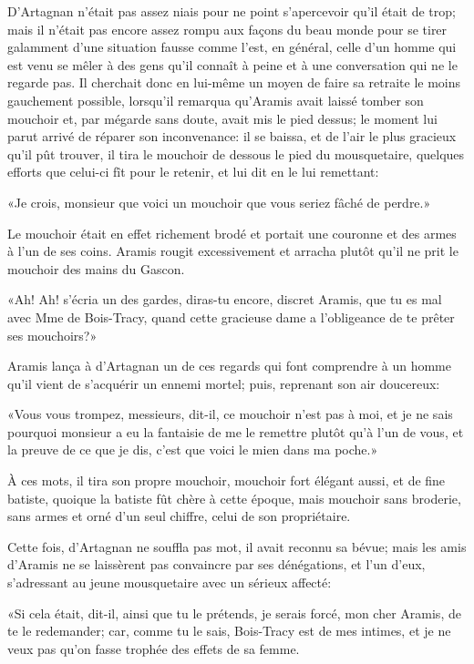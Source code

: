 D'Artagnan n'était pas assez niais pour ne point s'apercevoir qu'il était de trop; mais il n'était pas encore assez rompu aux façons du beau monde pour se tirer galamment d'une situation fausse comme l'est, en général, celle d'un homme qui est venu se mêler à des gens qu'il connaît à peine et à une conversation qui ne le regarde pas. Il cherchait donc en lui-même un moyen de faire sa retraite le moins gauchement possible, lorsqu'il remarqua qu'Aramis avait laissé tomber son mouchoir et, par mégarde sans doute, avait mis le pied dessus; le moment lui parut arrivé de réparer son inconvenance: il se baissa, et de l'air le plus gracieux qu'il pût trouver, il tira le mouchoir de dessous le pied du mousquetaire, quelques efforts que celui-ci fît pour le retenir, et lui dit en le lui remettant: 

«Je crois, monsieur que voici un mouchoir que vous seriez fâché de perdre.» 

Le mouchoir était en effet richement brodé et portait une couronne et des armes à l'un de ses coins. Aramis rougit excessivement et arracha plutôt qu'il ne prit le mouchoir des mains du Gascon. 

«Ah! Ah! s'écria un des gardes, diras-tu encore, discret Aramis, que tu es mal avec Mme de Bois-Tracy, quand cette gracieuse dame a l'obligeance de te prêter ses mouchoirs?» 

Aramis lança à d'Artagnan un de ces regards qui font comprendre à un homme qu'il vient de s'acquérir un ennemi mortel; puis, reprenant son air doucereux: 

«Vous vous trompez, messieurs, dit-il, ce mouchoir n'est pas à moi, et je ne sais pourquoi monsieur a eu la fantaisie de me le remettre plutôt qu'à l'un de vous, et la preuve de ce que je dis, c'est que voici le mien dans ma poche.» 

À ces mots, il tira son propre mouchoir, mouchoir fort élégant aussi, et de fine batiste, quoique la batiste fût chère à cette époque, mais mouchoir sans broderie, sans armes et orné d'un seul chiffre, celui de son propriétaire. 

Cette fois, d'Artagnan ne souffla pas mot, il avait reconnu sa bévue; mais les amis d'Aramis ne se laissèrent pas convaincre par ses dénégations, et l'un d'eux, s'adressant au jeune mousquetaire avec un sérieux affecté: 

«Si cela était, dit-il, ainsi que tu le prétends, je serais forcé, mon cher Aramis, de te le redemander; car, comme tu le sais, Bois-Tracy est de mes intimes, et je ne veux pas qu'on fasse trophée des effets de sa femme. 


